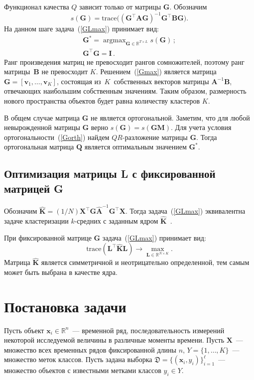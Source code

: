 Функционал качества $Q$ зависит только от матрицы $\mathbf{G}$. Обозначим
\[
s(\mathbf{G}) = \text{trace} \bigl((\mathbf{G}^{\top} \mathbf{A G})^{-1} \mathbf{G}^{\top} \mathbf{B G}\bigr).
\]
На данном шаге задача~(\ref{GLmax}) принимает вид:
\begin{gather}
\label{Gmax}
\mathbf{G}^* = \mathop{\arg \max}_{\mathbf{G} \in \mathbb{R}^{T \times L}} s(\mathbf{G})\,; \\
\label{Gorth}
\mathbf{G}^{\top} \mathbf{G} = \mathbf{I}\,.
\end{gather}
Ранг произведения матриц не превосходит рангов сомножителей, поэтому ранг матрицы~$\mathbf{B}$ не превосходит $K$.
Решением~(\ref{Gmax}) является матрица $\mathbf{G} = [\mathbf{v}_1, \ldots, \mathbf{v}_K]$, состоящая
из~$K$~собственных векторов матрицы $\mathbf{A}^{-1}\mathbf{B}$, отвечающих наибольшим собственным значениям.
Таким образом, размерность нового пространства объектов будет равна количеству кластеров $K$.

В общем случае матрица $\mathbf{G}$ не является ортогональной.
Заметим, что для любой невырожденной матрицы $\mathbf{G}$ верно $s(\mathbf{G}) = s(\mathbf{G M})$.
Для учета условия ортогональности~(\ref{Gorth}) найдем $QR$-разложение матрицы $\mathbf{G}$.
Тогда ортогональная матрица $\mathbf{Q}$ является оптимальным значением $\mathbf{G}^*$.

\subsection{Оптимизация матрицы L с фиксированной матрицей G}
\begin{theorem}
	Обозначим $\hat{\mathbf{K}} = (1/N)\mathbf{X}^{\top} \mathbf{G} \hat{\mathbf{A}}^{-1} \mathbf{G}^{\top} \mathbf{X}$.
	Тогда задача~(\ref{GLmax}) эквивалентна задаче кластеризации $k$-средних с заданным ядром $\hat{\mathbf{K}}$~\cite{shawe2004kernel}.
\end{theorem}

При фиксированной матрице $\mathbf{G}$ задача~(\ref{GLmax}) принимает вид:
\begin{equation*}
\text{trace} (\mathbf{L}^{\top} \hat{\mathbf{K}} \mathbf{L}) \to \max_{\mathbf{L} \in \mathbb{R}^{N \times K}}.
\end{equation*}
Матрица $\hat{\mathbf{K}}$ является симметричной и неотрицательно определенной, тем самым может быть выбрана в качестве ядра.



\section{Постановка задачи}
Пусть объект $\mathbf{x}_i \in \mathbb{R}^n$~--- временной ряд, последовательность измерений некоторой исследуемой величины в различные моменты времени.
Пусть $\mathbf{X}$~--- множество всех временных рядов фиксированной длины $n$, $Y = \{1, \dots, K\}$~--- множество меток классов.
Пусть задана выборка $\mathfrak{D} = \{(\mathbf{x}_i, y_i)\}_{i=1}^\ell$~--- множество объектов с известными метками классов $y_i \in Y$.

